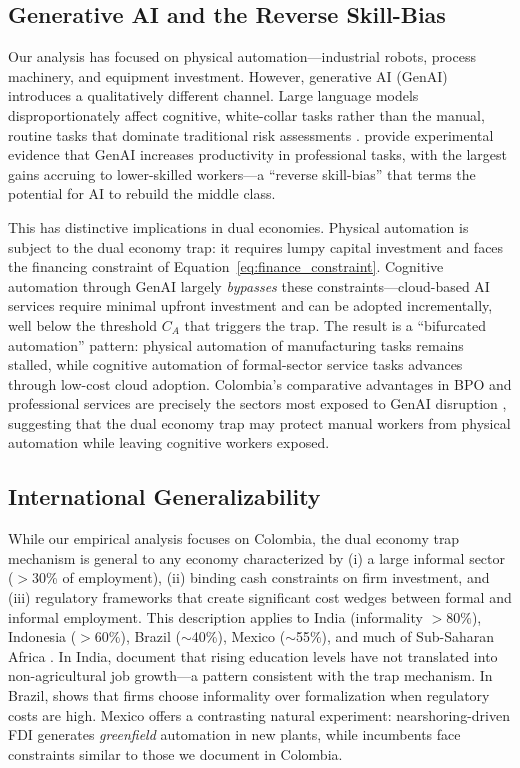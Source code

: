 \documentclass[5p,times,authoryear]{elsarticle}
\begin{document}
\subsection{Generative AI and the Reverse Skill-Bias}
\label{subsec:genai}

Our analysis has focused on physical automation---industrial robots, process machinery, and equipment investment. However, generative AI (GenAI) introduces a qualitatively different channel. Large language models disproportionately affect cognitive, white-collar tasks rather than the manual, routine tasks that dominate traditional risk assessments \citep{eloundou2023gpts, brynjolfsson2023generative}. \citet{noy2023experimental} provide experimental evidence that GenAI increases productivity in professional tasks, with the largest gains accruing to lower-skilled workers---a ``reverse skill-bias'' that \citet{autor2024middleclass} terms the potential for AI to rebuild the middle class.

This has distinctive implications in dual economies. Physical automation is subject to the dual economy trap: it requires lumpy capital investment and faces the financing constraint of Equation~\eqref{eq:finance_constraint}. Cognitive automation through GenAI largely \emph{bypasses} these constraints---cloud-based AI services require minimal upfront investment and can be adopted incrementally, well below the threshold $C_A$ that triggers the trap. The result is a ``bifurcated automation'' pattern: physical automation of manufacturing tasks remains stalled, while cognitive automation of formal-sector service tasks advances through low-cost cloud adoption. Colombia's comparative advantages in BPO and professional services are precisely the sectors most exposed to GenAI disruption \citep{eloundou2023gpts}, suggesting that the dual economy trap may protect manual workers from physical automation while leaving cognitive workers exposed.

\subsection{International Generalizability}
\label{subsec:generalizability}

While our empirical analysis focuses on Colombia, the dual economy trap mechanism is general to any economy characterized by (i) a large informal sector ($>$30\% of employment), (ii) binding cash constraints on firm investment, and (iii) regulatory frameworks that create significant cost wedges between formal and informal employment. This description applies to India (informality $>$80\%), Indonesia ($>$60\%), Brazil ($\sim$40\%), Mexico ($\sim$55\%), and much of Sub-Saharan Africa \citep{laporta2014, arias2023informality, diao2021manufacturing}. In India, \citet{mehrotra2019india} document that rising education levels have not translated into non-agricultural job growth---a pattern consistent with the trap mechanism. In Brazil, \citet{ulyssea2018} shows that firms choose informality over formalization when regulatory costs are high. Mexico offers a contrasting natural experiment: nearshoring-driven FDI generates \emph{greenfield} automation in new plants, while incumbents face constraints similar to those we document in Colombia.
\end{document}
